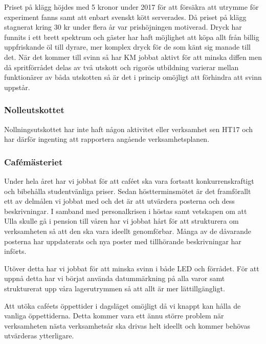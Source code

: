 \documentclass[../_main/handlingar.tex]{subfiles}
\begin{document}
Priset på klägg höjdes med 5 kronor under 2017 för att försäkra att utrymme för experiment fanns samt att enbart svenskt kött serverades. Då priset på klägg stagnerat kring 30 kr under flera år var prishöjningen motiverad. Dryck har funnits i ett brett spektrum och gäster har haft möjlighet att köpa allt från billig uppfriskande öl till dyrare, mer komplex dryck för de som känt sig manade till det. När det kommer till svinn så har KM jobbat aktivt för att minska diffen men då spritförrådet delas av två utskott och rigorös utbildning varierar mellan funktionärer av båda utskotten så är det i princip omöjligt att förhindra att svinn uppstår.

\subsubsection*{Nolleutskottet}
Nollningsutskottet har inte haft någon aktivitet eller verksamhet sen HT17 och har därför ingenting att rapportera angående verksamhetsplanen.

\subsubsection*{Cafémästeriet}
Under hela året har vi jobbat för att caféet ska vara fortsatt konkurrenskraftigt och bibehålla studentvänliga priser. Sedan höstterminsmötet är det framförallt ett av delmålen vi jobbat med och det är att utvärdera posterna och dess beskrivningar. I samband med personalkrisen i höstas samt vetskapen om att Ulla skulle gå i pension till våren har vi jobbat hårt för att strukturera om verksamheten så att den ska vara ideellt genomförbar. Många av de dåvarande posterna har uppdaterats och nya poster med tillhörande beskrivningar har införts.

Utöver detta har vi jobbat för att minska svinn i både LED och förrådet. För att uppnå detta har vi börjat använda datummärkning på alla varor samt strukturerat upp våra lagerutrymmen så att allt är mer lättillgängligt.

Att utöka caféets öppettider i dagsläget omöjligt då vi knappt kan hålla de vanliga öppettiderna. Detta kommer vara ett ännu större problem när verksamheten nästa verksamhetsår ska drivas helt ideellt och kommer behövas utvärderas ytterligare.
\end{document}

